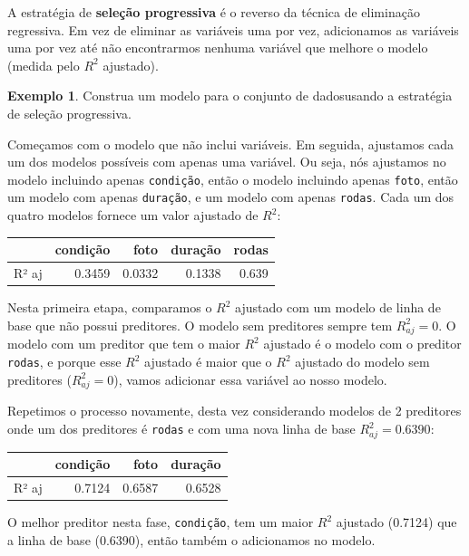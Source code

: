 \documentclass[
]{book}
\theoremstyle{definition}
\theoremstyle{definition}
\newtheorem{example}{Exemplo}[chapter]
\theoremstyle{definition}
\theoremstyle{definition}
\theoremstyle{remark}
\begin{document}
A estratégia de \textbf{seleção progressiva} é o reverso da técnica de eliminação regressiva. Em vez de eliminar as variáveis uma por vez, adicionamos as variáveis uma por vez até não encontrarmos nenhuma variável que melhore o modelo (medida pelo \(R^2\) ajustado).

\begin{example}
\protect\hypertarget{exm:forwardEliminationExampleWMarioKartData}{}{\label{exm:forwardEliminationExampleWMarioKartData} }Construa um modelo para o conjunto de dadosusando a estratégia de seleção progressiva.
\end{example}

Começamos com o modelo que não inclui variáveis. Em seguida, ajustamos cada um dos modelos possíveis com apenas uma variável. Ou seja, nós ajustamos no modelo incluindo apenas \texttt{condição}, então o modelo incluindo apenas \texttt{foto}, então um modelo com apenas \texttt{duração}, e um modelo com apenas \texttt{rodas}. Cada um dos quatro modelos fornece um valor ajustado de \(R^2\):

\begin{tabular}{l|r|r|r|r}
\hline
  & condição & foto & duração & rodas\\
\hline
R² aj & 0.3459 & 0.0332 & 0.1338 & 0.639\\
\hline
\end{tabular}

Nesta primeira etapa, comparamos o \(R^2\) ajustado com um modelo de linha de base que não possui preditores. O modelo sem preditores sempre tem \(R_{aj}^2 = 0\). O modelo com um preditor que tem o maior \(R^2\) ajustado é o modelo com o preditor \texttt{rodas}, e porque esse \(R^2\) ajustado é maior que o \(R^2\) ajustado do modelo sem preditores (\(R_{aj}^2 = 0\)), vamos adicionar essa variável ao nosso modelo.

Repetimos o processo novamente, desta vez considerando modelos de 2 preditores onde um dos preditores é \texttt{rodas} e com uma nova linha de base \(R^2_{aj} = 0.6390\):

\begin{tabular}{l|r|r|r}
\hline
  & condição & foto & duração\\
\hline
R² aj & 0.7124 & 0.6587 & 0.6528\\
\hline
\end{tabular}

O melhor preditor nesta fase, \texttt{condição}, tem um maior \(R^2\) ajustado (0.7124) que a linha de base (0.6390), então também o adicionamos no modelo.
\end{document}
